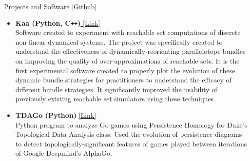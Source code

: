 \documentclass{resume} %
\begin{document}
\begin{rSection}{Projects and Software [\href{https://github.com/ekim1919}{Github}]}
  \begin{itemize}[leftmargin=*]
    \item {\bf Kaa (Python, C\verb!++!)}\href{https://github.com/Tarheel-Formal-Methods/kaa-dynamic}{ [Link] } \\
        Software created to experiment with reachable set computations of discrete non-linear dynamical systems. The project was specifically created to understand the effectiveness of dynamically-reorienting parallelotope bundles on improving the quality of over-approximations of reachable sets. It is the first experimental software created to properly plot the evolution of these dynamic bundle strategies for practitioners to understand the efficacy of different bundle strategies. It significantly improved the usability of previously existing reachable set simulators using these techniques.

    \item
        {\bf TDAGo (Python)} \href{https://github.com/ekim1919/TDAGo}{ [Link] }\\
        Python program to analyze Go games using Persistence Homology for Duke's Topological Data Analysis class. Used the evolution of persistence diagrams to detect topologically-significant features of games played between iterations of Google Deepmind's AlphaGo. \newline

  \end{itemize}
\end{rSection}
\end{document}
